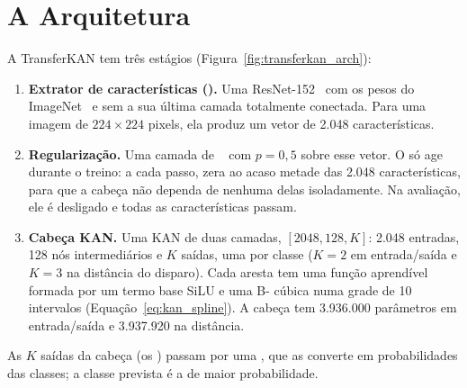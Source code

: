 \section{A Arquitetura}
\label{sec:transferkan_arch}

A TransferKAN tem três estágios (Figura~\ref{fig:transferkan_arch}):
\begin{enumerate}
    \item \textbf{Extrator de características ().} Uma ResNet-152~\cite{he2016resnet} com os pesos do ImageNet~\cite{deng2009imagenet} e sem a sua última camada totalmente conectada. Para uma imagem de $224 \times 224$ pixels, ela produz um vetor de 2.048 características.
    \item \textbf{Regularização.} Uma camada de ~\cite{srivastava2014dropout} com $p=0{,}5$ sobre esse vetor. O  só age durante o treino: a cada passo, zera ao acaso metade das 2.048 características, para que a cabeça não dependa de nenhuma delas isoladamente. Na avaliação, ele é desligado e todas as características passam.
    \item \textbf{Cabeça KAN.} Uma KAN de duas camadas, $[2048, 128, K]$: 2.048 entradas, 128 nós intermediários e $K$ saídas, uma por classe ($K=2$ em entrada/saída e $K=3$ na distância do disparo). Cada aresta tem uma função aprendível formada por um termo base \gls{SiLU} e uma B- cúbica numa grade de 10 intervalos (Equação~\ref{eq:kan_spline}). A cabeça tem 3.936.000 parâmetros em entrada/saída e 3.937.920 na distância.
\end{enumerate}
As $K$ saídas da cabeça (os ) passam por uma , que as converte em probabilidades das classes; a classe prevista é a de maior probabilidade.

